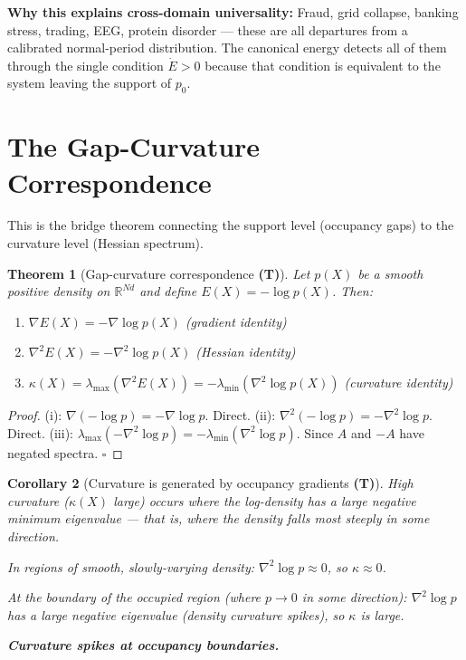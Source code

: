 \documentclass[11pt,a4paper]{article}
\newtheorem{theorem}{Theorem}[section]
\newtheorem{corollary}[theorem]{Corollary}
\theoremstyle{definition}
\newcommand{\R}{\mathbb{R}}
\begin{document}
\noindent
\textbf{Why this explains cross-domain universality:}
Fraud, grid collapse, banking stress, trading, EEG, protein disorder --- these are
all departures from a calibrated normal-period distribution.
The canonical energy detects all of them through the single condition $\dot E > 0$
because that condition is equivalent to the system leaving the support of $p_0$.

\section{The Gap-Curvature Correspondence}
\label{sec:gap_curvature}

\noindent
This is the bridge theorem connecting the support level (occupancy gaps)
to the curvature level (Hessian spectrum).

\begin{theorem}[Gap-curvature correspondence \textbf{(T)}]
\label{thm:gap_curvature}
Let $p(X)$ be a smooth positive density on $\R^{Nd}$ and define
$E(X) = -\log p(X)$.
Then:
\begin{enumerate}[label=(\roman*)]
\item $\nabla E(X) = -\nabla\log p(X)$ \hfill (gradient identity)
\item $\nabla^2 E(X) = -\nabla^2\log p(X)$ \hfill (Hessian identity)
\item $\kappa(X) = \lambda_\mathrm{max}(\nabla^2 E(X)) = -\lambda_\mathrm{min}(\nabla^2\log p(X))$ \hfill (curvature identity)
\end{enumerate}
\end{theorem}

\begin{proof}
(i): $\nabla(-\log p) = -\nabla\log p$. Direct.
(ii): $\nabla^2(-\log p) = -\nabla^2\log p$. Direct.
(iii): $\lambda_\mathrm{max}(-\nabla^2\log p) = -\lambda_\mathrm{min}(\nabla^2\log p)$.
Since $A$ and $-A$ have negated spectra. $\square$
\end{proof}

\begin{corollary}[Curvature is generated by occupancy gradients \textbf{(T)}]
\label{cor:curvature_occupancy}
High curvature ($\kappa(X)$ large) occurs where the log-density has a
large negative minimum eigenvalue --- that is, where the density falls
most steeply in some direction.

In regions of smooth, slowly-varying density: $\nabla^2\log p \approx 0$,
so $\kappa \approx 0$.

At the boundary of the occupied region (where $p \to 0$ in some direction):
$\nabla^2\log p$ has a large negative eigenvalue (density curvature spikes),
so $\kappa$ is large.

\textbf{Curvature spikes at occupancy boundaries.}
\end{corollary}
\end{document}
